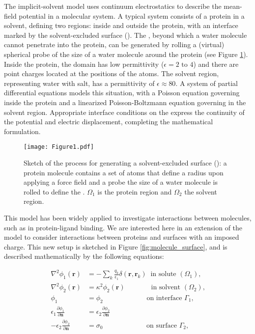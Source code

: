 
The implicit-solvent model uses continuum electrostatics to describe the mean-field potential in a molecular system. A typical system consists of a protein in a solvent, defining two regions: inside and outside the protein, with an interface marked by the solvent-excluded surface (\ses).  The \ses, beyond which a water molecule cannot penetrate into the protein, can be generated by rolling a (virtual) spherical probe of the size of a water molecule around the protein (see Figure \ref{fig:forcefield-ses}). Inside the protein, the domain has low permittivity ($\epsilon= 2\text{ to }4$) and there are point charges located at the positions of the atoms. The solvent region, representing water with salt, has a permittivity of $\epsilon \approx 80$. A system of partial differential equations models this situation, with a Poisson equation governing inside the protein and a linearized Poisson-Boltzmann equation governing in the solvent region. Appropriate interface conditions on the \ses express the continuity of the potential and electric displacement, completing the mathematical formulation.

\begin{figure}%
   \texttt{[image: Figure1.pdf]} 
   \caption{Sketch of the process for generating a solvent-excluded surface (\ses): a protein molecule contains a set of atoms that define a radius upon applying a force field and a probe the size of a water molecule is rolled to define the  \ses. $\Omega_1$ is the protein region and $\Omega_2$ the solvent region.}
   \label{fig:forcefield-ses}
\end{figure}

This model has been widely applied to investigate interactions between molecules, such as in protein-ligand binding. We are interested here in an extension of the model to consider interactions between proteins and surfaces with an imposed charge. This new setup is sketched in Figure \ref{fig:molecule_surface}, and is described mathematically by the following equations:


\begin{align} \label{eq:pde}
\nabla^2 \phi_1(\mathbf{r}) &= - \sum_k \frac{q_k}{\epsilon_1} \delta(\mathbf{r},\mathbf{r}_k) \ \text{ in solute $(\Omega_1)$,}  \nonumber \\ 
\nabla^2\phi_2 (\mathbf{r}) &= \kappa^2 \phi_2(\mathbf{r}) \quad \qquad \ \ \text{ in solvent $(\Omega_2)$,}  \nonumber \\ 
\phi_1 &=\phi_2 \qquad \qquad \qquad \text{ on interface $\Gamma_1$,}  \nonumber \\ 
\epsilon_1 \frac{\partial \phi_1}{\partial \mathbf{n}} &= \epsilon_2 \frac{\partial \phi_2}{\partial \mathbf{n}} \nonumber \\
-\epsilon_2 \frac{\partial \phi_2}{\partial \mathbf{n}} &= \sigma_0 \qquad \qquad \qquad \text{ on surface $\Gamma_2$,} 
\end{align}

